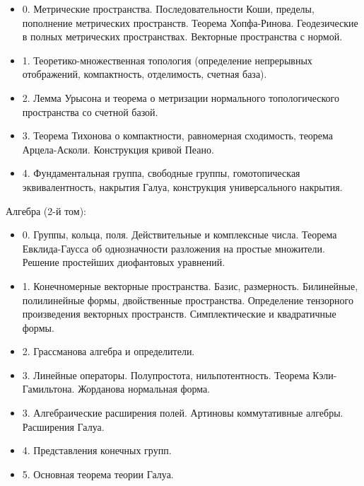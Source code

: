 \documentclass[12pt]{book}
\theoremstyle{upshape}
\theoremstyle{generic}
\theoremstyle{upshapenonumber}
\newcommand{\следствие}{%
     \refstepcounter{teorema}
     {\noindent\bf Следствие \thechapter.\arabic{teorema}:\ }}
\newcommand{\пример}{%
     \refstepcounter{teorema}
     {\noindent\bf Пример \thechapter.\arabic{teorema}:\ }}
\newcommand{\лемма}{%
     \refstepcounter{teorema}
     {\noindent\bf Лемма \thechapter.\arabic{teorema}:\ }}
\newcommand{\теорема}{%
     \refstepcounter{teorema}
     {\noindent\bf Теорема \thechapter.\arabic{teorema}:\ }}
\newcommand{\утверждение}{%
     \refstepcounter{teorema}
     {\noindent\bf Утверждение \thechapter.\arabic{teorema}:\ }}
\begin{document}
\begin{itemize}
\item 0. Метрические пространства. 
Последовательности Коши, пределы, пополнение
метрических пространств. Теорема Хопфа-Ринова.
Геодезические в полных метрических пространствах.
Векторные пространства с нормой.

\item 1. Теоретико-множественная топология
(определение непрерывных отображений, компактность,
отделимость, счетная база).

\item 2. Лемма Урысона и теорема о метризации
нормального топологического пространства со счетной базой.

\item 3.  Теорема Тихонова о компактности, равномерная
сходимость, теорема Арцела-Асколи. 
Конструкция кривой Пеано.

\item 4. Фундаментальная группа, свободные группы,
гомотопическая эквивалентность, накрытия Галуа,
конструкция универсального накрытия.
\end{itemize}


Алгебра (2-й том):

\begin{itemize}

\item 0. Группы, кольца, поля. Действительные и
комплексные числа. Теорема Евклида-Гаусса
об однозначности разложения на простые множители.
Решение простейших диофантовых уравнений.

\item 1. Конечномерные векторные пространства.
 Базис, размерность. Билинейные, полилинейные формы,
двойственные пространства. Определение тензорного 
произведения векторных пространств.
Симплектические и квадратичные формы. 

\item 2. Грассманова алгебра и определители.

\item 3.  Линейные операторы. Полупростота,
нильпотентность. Теорема Кэли-Гамильтона.
Жорданова нормальная форма.

\item 3. Алгебраические расширения полей. Артиновы
коммутативные алгебры. Расширения Галуа.

\item 4. Представления конечных групп.

\item 5. Основная теорема теории Галуа.

\end{itemize}
\end{document}
